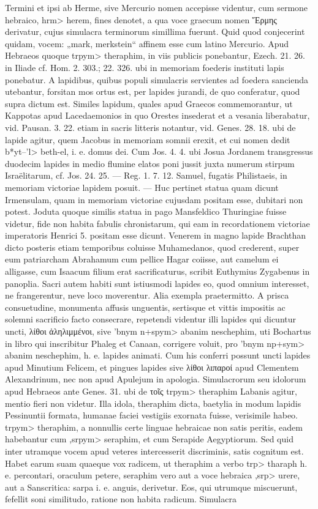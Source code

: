 \documentclass[a4paper, 11pt, oneside, polutonikogreek, german]{article}
\begin{document}
\hspace*{0mm}Termini et ipsi ab Herme, sive Mercurio nomen accepisse videntur, cum sermone hebraico, \<hrm> herem, fines denotet, a qua voce graecum nomen Ἕρμης derivatur, cujus simulacra terminorum simillima fuerunt. Quid quod conjecerint quidam, vocem: „mark, merkstein“ affinem esse cum latino Mercurio. Apud Hebraeos quoque \<trpym> theraphim, in viis publicis ponebantur, Ezech. 21. 26. in Iliade cf. Hom. 2. 303.; 22. 326. ubi in memoriam foederis instituti lapis ponebatur. A lapidibus, quibus populi simulacris servientes ad foedera sancienda utebantur, forsitan mos ortus est, per lapides jurandi, de quo conferatur, quod supra dictum est. Similes lapidum, quales apud Graecos commemorantur, ut Kappotas apud Lacedaemonios in quo Orestes insederat et a vesania liberabatur, vid. Pausan. 3. 22. etiam in sacris litteris notantur, vid. Genes. 28. 18. ubi de lapide agitur, quem Jacobus in memoriam somnii erexit, et cui nomen dedit \<b*yt--'l> beth-el, i. e. domus dei. Cum Jos. 4. 4. ubi Josua Jordanem transgressus duodecim lapides in medio flumine elatos poni jussit juxta numerum stirpum Israëlitarum, cf. Jos. 24. 25. --- Reg. 1. 7. 12. Samuel, fugatis Philistaeis, in memoriam victoriae lapidem posuit. --- Huc pertinet statua quam dicunt Irmensulam, quam in memoriam victoriae cujusdam positam esse, dubitari non potest. Joduta quoque similis statua in pago Mansfeldico Thuringiae fuisse videtur, fide non habita fabulis chronistarum, qui eam in recordationem victoriae imperatoris Henrici 5. positam esse dicunt. Venerem in magno lapide Brachthan dicto posteris etiam temporibus coluisse Muhamedanos, quod crederent, super eum patriarcham Abrahamum cum pellice Hagar coiisse, aut camelum ei alligasse, cum Isaacum filium erat sacrificaturus, scribit Euthymius Zygabenus in panoplia. Sacri autem habiti sunt istiusmodi lapides eo, quod omnium interesset, ne frangerentur, neve loco moverentur. Alia exempla praetermitto. A prisca consuetudine, monumenta affusis unguentis, sertisque et vittis impositis ac solemni sacrificio facto consecrare, repetendi videntur illi lapides qui dicuntur uncti, λίθοι ἀληλιμμένοι, sive \<'bnym n+spym> abanim neschephim, uti Bochartus in libro qui inscribitur Phaleg et Canaan, corrigere voluit, pro \<'bnym np+sym> abanim neschephim, h. e. lapides animati. Cum his conferri possunt uncti lapides apud Minutium Felicem, et pingues lapides sive λίθοι λιπαροί apud Clementem Alexandrinum, nec non apud Apulejum in apologia. Simulacrorum seu idolorum apud Hebraeos ante Genes. 31. ubi de τοῖς \<trpym> theraphim Labanis agitur, mentio fieri non videtur. Illa idola, theraphim dicta, baetylia in modum lapidis Pessinuntii formata, humanae faciei vestigiis exornata fuisse, verisimile habeo. \<trpym> theraphim, a nonnullis certe linguae hebraicae non satis peritis, eadem habebantur cum \<,srpym> seraphim, et cum Serapide Aegyptiorum. Sed quid inter utramque vocem apud veteres intercesserit discriminis, satis cognitum est. Habet earum suam quaeque vox radicem, ut theraphim a verbo \<trp> tharaph h. e. percontari, oraculum petere, seraphim vero aut a voce hebraica \<,srp> urere, aut a Sanscritica: sarpa i. e. anguis, derivetur. Eos, qui utrumque miscuerunt, fefellit soni similitudo, ratione non habita radicum. Simulacra 
\end{document}
